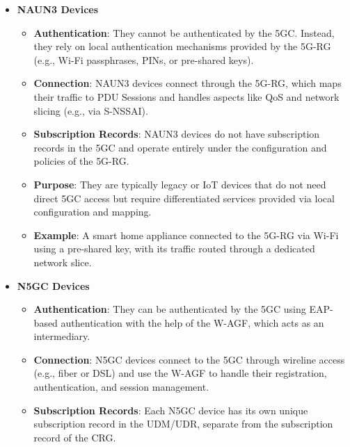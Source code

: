 \begin{itemize}
    \item {
          \textbf{\ac{NAUN3} Devices}
          \begin{itemize}
              \item {
                    \textbf{Authentication}: They cannot be authenticated by the \ac{5GC}. Instead, they rely on local authentication mechanisms provided by the \ac{5G-RG} (e.g., Wi-Fi passphrases, \acp{PIN}, or pre-shared keys).
                    }
              \item {
                    \textbf{Connection}: \ac{NAUN3} devices connect through the \ac{5G-RG}, which maps their traffic to \ac{PDU} Sessions and handles aspects like \ac{QoS} and network slicing (e.g., via \ac{S-NSSAI}).
                    }
              \item {
                    \textbf{Subscription Records}: \ac{NAUN3} devices do not have subscription records in the \ac{5GC} and operate entirely under the configuration and policies of the \ac{5G-RG}.
                    }
              \item {
                    \textbf{Purpose}: They are typically legacy or \ac{IoT} devices that do not need direct \ac{5GC} access but require differentiated services provided via local configuration and mapping.
                    }
              \item {
                    \textbf{Example}: A smart home appliance connected to the \ac{5G-RG} via Wi-Fi using a pre-shared key, with its traffic routed through a dedicated network slice.
                    }
          \end{itemize}
          }
    \item {
          \textbf{\ac{N5GC} Devices}
          \begin{itemize}
              \item {
                    \textbf{Authentication}: They can be authenticated by the \ac{5GC} using \ac{EAP}-based authentication with the help of the \ac{W-AGF}, which acts as an intermediary.
                    }
              \item {
                    \textbf{Connection}: \ac{N5GC} devices connect to the \ac{5GC} through wireline access (e.g., fiber or \ac{DSL}) and use the \ac{W-AGF} to handle their registration, authentication, and session management.
                    }
              \item {
                    \textbf{Subscription Records}: Each \ac{N5GC} device has its own unique subscription record in the \ac{UDM}/\ac{UDR}, separate from the subscription record of the \ac{CRG}.
}
\end{itemize}}
\end{itemize}
